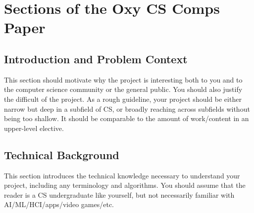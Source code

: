 \documentclass[10pt,twocolumn]{article}
\begin{document}

\section{Sections of the Oxy CS Comps Paper}
\label{sec:paper}

\subsection{Introduction and Problem Context}

This section should motivate why the project is interesting both to you and to the computer science community or the general public.
You should also justify the difficult of the project.
As a rough guideline, your project should be either narrow but deep in a subfield of CS, or broadly reaching across subfields without being too shallow.
It should be comparable to the amount of work/content in an upper-level elective.

\subsection{Technical Background}

This section introduces the technical knowledge necessary to understand your project, including any terminology and algorithms.
You should assume that the reader is a CS undergraduate like yourself, but not necessarily familiar with AI/ML/HCI/apps/video games/etc. 
\end{document}
